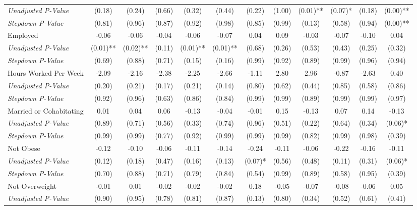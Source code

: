 \begin{tabular}{l c c c c c c c c c c c}
\quad \textit{Unadjusted P-Value} & (0.18) & (0.24) & (0.66) & (0.32) & (0.44) & (0.22) & (1.00) & (0.01)** & (0.07)* & (0.18) & (0.00)** \\
\quad \textit{Stepdown P-Value} & (0.81) & (0.96) & (0.87) & (0.92) & (0.98) & (0.85) & (0.99) & (0.13) & (0.58) & (0.94) & (0.00)** \\
Employed & -0.06 & -0.06 & -0.04 & -0.06 & -0.07 & 0.04 & 0.09 & -0.03 & -0.07 & -0.10 & 0.04 \\
\quad \textit{Unadjusted P-Value} & (0.01)** & (0.02)** & (0.11) & (0.01)** & (0.01)** & (0.68) & (0.26) & (0.53) & (0.43) & (0.25) & (0.32) \\
\quad \textit{Stepdown P-Value} & (0.69) & (0.88) & (0.71) & (0.15) & (0.16) & (0.99) & (0.92) & (0.89) & (0.99) & (0.96) & (0.94) \\
Hours Worked Per Week & -2.09 & -2.16 & -2.38 & -2.25 & -2.66 & -1.11 & 2.80 & 2.96 & -0.87 & -2.63 & 0.40 \\
\quad \textit{Unadjusted P-Value} & (0.20) & (0.21) & (0.17) & (0.21) & (0.14) & (0.80) & (0.62) & (0.44) & (0.85) & (0.58) & (0.86) \\
\quad \textit{Stepdown P-Value} & (0.92) & (0.96) & (0.63) & (0.86) & (0.84) & (0.99) & (0.99) & (0.89) & (0.99) & (0.99) & (0.97) \\
Married or Cohabitating & 0.01 & 0.04 & 0.06 & -0.13 & -0.04 & -0.01 & 0.15 & -0.13 & 0.07 & 0.14 & -0.13 \\
\quad \textit{Unadjusted P-Value} & (0.89) & (0.71) & (0.56) & (0.33) & (0.74) & (0.96) & (0.51) & (0.22) & (0.64) & (0.34) & (0.06)* \\
\quad \textit{Stepdown P-Value} & (0.99) & (0.99) & (0.77) & (0.92) & (0.99) & (0.99) & (0.99) & (0.82) & (0.99) & (0.98) & (0.39) \\
Not Obese & -0.12 & -0.10 & -0.06 & -0.11 & -0.14 & -0.24 & -0.11 & -0.06 & -0.22 & -0.16 & -0.11 \\
\quad \textit{Unadjusted P-Value} & (0.12) & (0.18) & (0.47) & (0.16) & (0.13) & (0.07)* & (0.56) & (0.48) & (0.11) & (0.31) & (0.06)* \\
\quad \textit{Stepdown P-Value} & (0.70) & (0.88) & (0.71) & (0.79) & (0.84) & (0.54) & (0.99) & (0.89) & (0.58) & (0.95) & (0.39) \\
Not Overweight & -0.01 & 0.01 & -0.02 & -0.02 & -0.02 & 0.18 & -0.05 & -0.07 & -0.08 & -0.06 & 0.05 \\
\quad \textit{Unadjusted P-Value} & (0.90) & (0.95) & (0.78) & (0.81) & (0.87) & (0.13) & (0.80) & (0.34) & (0.52) & (0.61) & (0.41) \\

\end{tabular}
